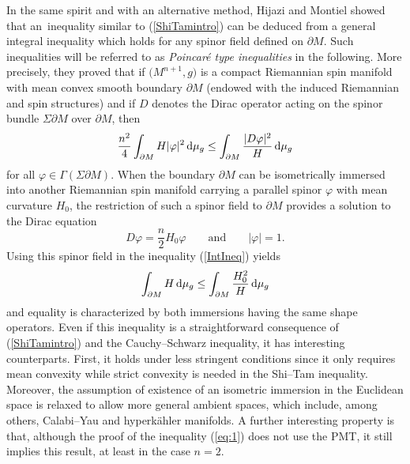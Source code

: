 \documentclass[pdftex]{sigma}
\numberwithin{equation}{section}
\begin{document}
In the same spirit and with an alternative method, Hijazi and Montiel
\cite{HijaziMontiel14} showed that an~inequa\-li\-ty similar to (\ref{ShiTamintro}) can be deduced from
a general integral inequa\-li\-ty which holds for any spinor field defined on $\partial M$.
Such i\-ne\-qua\-li\-ties will be referred to as {\it Poincar\'e type i\-ne\-qua\-li\-ties} in
the following.
More precisely, they proved that if $\big(M^{n+1},g\big)$ is a compact Riemannian spin
ma\-ni\-fold with mean convex smooth boundary $\partial M$ (endowed with the induced
Riemannian and spin structures) and if $D$ denotes the Dirac operator acting on
the spinor bundle $\Sigma\partial M$ over $\partial M$, then 
\begin{gather}\label{IntIneq}
\frac{n^2}{4}\int_{\partial M} H|\varphi|^2\,{\rm d}\mu_g\leq\int_{\partial M}\frac{|D\varphi|^2}{H}\,{\rm d}\mu_g
\end{gather}
for all $\varphi\in\Gamma(\Sigma\partial M)$.
When the boundary $\partial M$ can be isometrically immersed into another Riemannian spin
ma\-ni\-fold carrying a parallel spinor $\varphi$ with mean curvature $H_0$, the
restriction of such a spinor field to $\partial M$ provides a solution to the Dirac equation
\[
D\varphi=\frac{n}{2}H_0\varphi\qquad\textrm{and}\qquad |\varphi|=1.
\]
Using this spinor field in the i\-ne\-qua\-li\-ty (\ref{IntIneq}) yields
\begin{equation}\label{eq:1}
\int_{\partial M}H\,{\rm d}\mu_g\leq \int_{\partial M} \frac{H_0^2}{H}\,{\rm d}\mu_g
\end{equation}
and equality is characterized by both immersions having the same
shape o\-pe\-ra\-tors.
Even if this i\-ne\-qua\-li\-ty is a straightforward consequence of (\ref{ShiTamintro}) and
the Cauchy--Schwarz i\-ne\-qua\-li\-ty, it has interesting counterparts.
First, it holds under less stringent conditions since it only requires
mean convexity while strict convexity is needed in the Shi--Tam i\-ne\-qua\-li\-ty.
Moreover, the assumption of existence of an isometric immersion in the Euclidean space is relaxed to allow more general ambient spaces, which include, among others, Calabi--Yau and hyperk\"ahler ma\-ni\-folds.
A further interesting property is that, although the proof of the i\-ne\-qua\-li\-ty
(\ref{eq:1}) does not use the PMT, it still implies this result, at least in the
case $n=2$.
\end{document}

